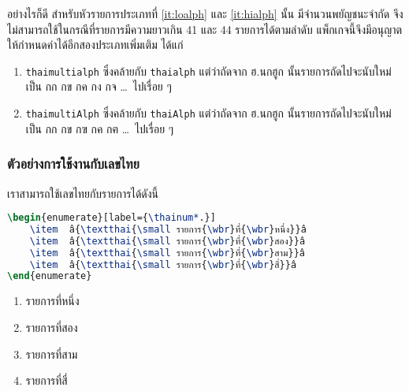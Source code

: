 \documentclass[11pt]{ltxguide}
\renewcommand{\baselinestretch}{1.5}
\begin{document}
\medskip
อย่างไร{\wbr}ก็{\wbr}ดี สำหรับ{\wbr}หัว{\wbr}รายการ{\wbr}ประเภท{\wbr}ที่ \ref{it:loalph} และ \ref{it:hialph} นั้น มี{\wbr}จำนวน{\wbr}พยัญชนะ{\wbr}จำกัด จึง{\wbr}ไม่{\wbr}สามารถ{\wbr}ใช้{\wbr}ใน{\wbr}กรณี{\wbr}ที่{\wbr}รายการ{\wbr}มี{\wbr}ความ{\wbr}ยาว{\wbr}เกิน 41 และ 44 รายการ{\wbr}ได้{\wbr}ตาม{\wbr}ลำดับ แพ็ก{\wbr}เก{\wbr}จ{\wbr}นี้{\wbr}จึง{\wbr}มี{\wbr}อนุญาต{\wbr}ให้{\wbr}กำหนด{\wbr}ค่า{\wbr}ได้{\wbr}อีก{\wbr}สอง{\wbr}ประเภท{\wbr}เพิ่มเติม ได้แก่{\wbr}

\begin{enumerate}[topsep=0.25pc,itemsep=0pc,start=4,label={\thainum*.}]
    \item  \texttt{thaimultialph} ซึ่ง{\wbr}คล้าย{\wbr}กับ \texttt{thaialph} แต่ว่า{\wbr}ถัด{\wbr}จาก ฮ.{\wbr}นก{\wbr}ฮูก นั้น{\wbr}รายการ{\wbr}ถัด{\wbr}ไป{\wbr}จะ{\wbr}นับ{\wbr}ใหม่{\wbr}เป็น กก กข กค กง กจ \ldots\, ไป{\wbr}เรื่อย ๆ
    \item  \texttt{thaimultiAlph} ซึ่ง{\wbr}คล้าย{\wbr}กับ \texttt{thaiAlph} แต่ว่า{\wbr}ถัด{\wbr}จาก ฮ.{\wbr}นก{\wbr}ฮูก นั้น{\wbr}รายการ{\wbr}ถัด{\wbr}ไป{\wbr}จะ{\wbr}นับ{\wbr}ใหม่{\wbr}เป็น กก กข กฃ กค กฅ \ldots\, ไป{\wbr}เรื่อย ๆ
\end{enumerate}

\newpage
\subsubsection{ตัวอย่าง{\wbr}การ{\wbr}ใช้งาน{\wbr}กับ{\wbr}เลข{\wbr}ไทย}

เรา{\wbr}สามารถ{\wbr}ใช้{\wbr}เลข{\wbr}ไทย{\wbr}กับ{\wbr}รายการ{\wbr}ได้{\wbr}ดังนี้{\wbr}

\smallskip
\renewcommand{\baselinestretch}{0.1}
\begin{lstlisting}[language=LaTeX,escapechar={â},basicstyle=\ttfamily,lineskip={0.05pc}]
\begin{enumerate}[label={\thainum*.}]
    \item  â{\textthai{\small รายการ{\wbr}ที่{\wbr}หนึ่ง}}â
    \item  â{\textthai{\small รายการ{\wbr}ที่{\wbr}สอง}}â
    \item  â{\textthai{\small รายการ{\wbr}ที่{\wbr}สาม}}â
    \item  â{\textthai{\small รายการ{\wbr}ที่{\wbr}สี่}}â
\end{enumerate}
\end{lstlisting}
\renewcommand{\baselinestretch}{1.5}

\begin{enumerate}[topsep=0pc,itemsep=0pc,label={\thainum*.}]
    \item  รายการ{\wbr}ที่{\wbr}หนึ่ง{\wbr}
    \item  รายการ{\wbr}ที่{\wbr}สอง{\wbr}
    \item  รายการ{\wbr}ที่{\wbr}สาม{\wbr}
    \item  รายการ{\wbr}ที่{\wbr}สี่{\wbr}
\end{enumerate}
\end{document}
